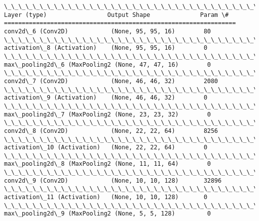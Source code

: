 \documentclass[11pt]{article}
\begin{document}
    \begin{Verbatim}[commandchars=\\\{\}]
\_\_\_\_\_\_\_\_\_\_\_\_\_\_\_\_\_\_\_\_\_\_\_\_\_\_\_\_\_\_\_\_\_\_\_\_\_\_\_\_\_\_\_\_\_\_\_\_\_\_\_\_\_\_\_\_\_\_\_\_\_\_\_\_\_
Layer (type)                 Output Shape              Param \#   
=================================================================
conv2d\_6 (Conv2D)            (None, 95, 95, 16)        80        
\_\_\_\_\_\_\_\_\_\_\_\_\_\_\_\_\_\_\_\_\_\_\_\_\_\_\_\_\_\_\_\_\_\_\_\_\_\_\_\_\_\_\_\_\_\_\_\_\_\_\_\_\_\_\_\_\_\_\_\_\_\_\_\_\_
activation\_8 (Activation)    (None, 95, 95, 16)        0         
\_\_\_\_\_\_\_\_\_\_\_\_\_\_\_\_\_\_\_\_\_\_\_\_\_\_\_\_\_\_\_\_\_\_\_\_\_\_\_\_\_\_\_\_\_\_\_\_\_\_\_\_\_\_\_\_\_\_\_\_\_\_\_\_\_
max\_pooling2d\_6 (MaxPooling2 (None, 47, 47, 16)        0         
\_\_\_\_\_\_\_\_\_\_\_\_\_\_\_\_\_\_\_\_\_\_\_\_\_\_\_\_\_\_\_\_\_\_\_\_\_\_\_\_\_\_\_\_\_\_\_\_\_\_\_\_\_\_\_\_\_\_\_\_\_\_\_\_\_
conv2d\_7 (Conv2D)            (None, 46, 46, 32)        2080      
\_\_\_\_\_\_\_\_\_\_\_\_\_\_\_\_\_\_\_\_\_\_\_\_\_\_\_\_\_\_\_\_\_\_\_\_\_\_\_\_\_\_\_\_\_\_\_\_\_\_\_\_\_\_\_\_\_\_\_\_\_\_\_\_\_
activation\_9 (Activation)    (None, 46, 46, 32)        0         
\_\_\_\_\_\_\_\_\_\_\_\_\_\_\_\_\_\_\_\_\_\_\_\_\_\_\_\_\_\_\_\_\_\_\_\_\_\_\_\_\_\_\_\_\_\_\_\_\_\_\_\_\_\_\_\_\_\_\_\_\_\_\_\_\_
max\_pooling2d\_7 (MaxPooling2 (None, 23, 23, 32)        0         
\_\_\_\_\_\_\_\_\_\_\_\_\_\_\_\_\_\_\_\_\_\_\_\_\_\_\_\_\_\_\_\_\_\_\_\_\_\_\_\_\_\_\_\_\_\_\_\_\_\_\_\_\_\_\_\_\_\_\_\_\_\_\_\_\_
conv2d\_8 (Conv2D)            (None, 22, 22, 64)        8256      
\_\_\_\_\_\_\_\_\_\_\_\_\_\_\_\_\_\_\_\_\_\_\_\_\_\_\_\_\_\_\_\_\_\_\_\_\_\_\_\_\_\_\_\_\_\_\_\_\_\_\_\_\_\_\_\_\_\_\_\_\_\_\_\_\_
activation\_10 (Activation)   (None, 22, 22, 64)        0         
\_\_\_\_\_\_\_\_\_\_\_\_\_\_\_\_\_\_\_\_\_\_\_\_\_\_\_\_\_\_\_\_\_\_\_\_\_\_\_\_\_\_\_\_\_\_\_\_\_\_\_\_\_\_\_\_\_\_\_\_\_\_\_\_\_
max\_pooling2d\_8 (MaxPooling2 (None, 11, 11, 64)        0         
\_\_\_\_\_\_\_\_\_\_\_\_\_\_\_\_\_\_\_\_\_\_\_\_\_\_\_\_\_\_\_\_\_\_\_\_\_\_\_\_\_\_\_\_\_\_\_\_\_\_\_\_\_\_\_\_\_\_\_\_\_\_\_\_\_
conv2d\_9 (Conv2D)            (None, 10, 10, 128)       32896     
\_\_\_\_\_\_\_\_\_\_\_\_\_\_\_\_\_\_\_\_\_\_\_\_\_\_\_\_\_\_\_\_\_\_\_\_\_\_\_\_\_\_\_\_\_\_\_\_\_\_\_\_\_\_\_\_\_\_\_\_\_\_\_\_\_
activation\_11 (Activation)   (None, 10, 10, 128)       0         
\_\_\_\_\_\_\_\_\_\_\_\_\_\_\_\_\_\_\_\_\_\_\_\_\_\_\_\_\_\_\_\_\_\_\_\_\_\_\_\_\_\_\_\_\_\_\_\_\_\_\_\_\_\_\_\_\_\_\_\_\_\_\_\_\_
max\_pooling2d\_9 (MaxPooling2 (None, 5, 5, 128)         0         

\end{Verbatim}
\end{document}
